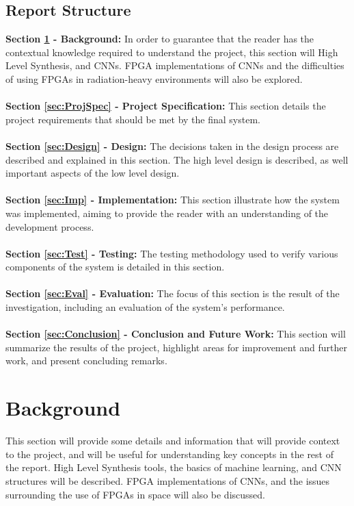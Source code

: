 \documentclass[12pt]{article}
\begin{document}
\subsection{Report Structure}
\label{sec:Intro-Structure}

\textbf{Section \ref{sec:Background} - Background:} In order to guarantee that the reader has the contextual knowledge required to understand the project, this section will High Level Synthesis, and CNNs. FPGA implementations of CNNs and the difficulties of using FPGAs in radiation-heavy environments will also be explored.\\
\\
\textbf{Section \ref{sec:ProjSpec} - Project Specification:} This section details the project requirements that should be met by the final system.\\
\\
\textbf{Section \ref{sec:Design} - Design:} The decisions taken in the design process are described and explained in this section. The high level design is described, as well important aspects of the low level design.\\
\\
\textbf{Section \ref{sec:Imp} - Implementation:} This section illustrate how the system was implemented, aiming to provide the reader with an understanding of the development process.\\
\\
\textbf{Section \ref{sec:Test} - Testing:} The testing methodology used to verify various components of the system is detailed in this section.\\
\\
\textbf{Section \ref{sec:Eval} - Evaluation:} The focus of this section is the result of the investigation, including an evaluation of the system's performance.\\
\\
\textbf{Section \ref{sec:Conclusion} - Conclusion and Future Work:} This section will summarize the results of the project, highlight areas for improvement and further work, and present concluding remarks.\\

\newpage

\section{Background}
\label{sec:Background}


This section will provide some details and information that will provide context to the project, and will be useful for understanding key concepts in the rest of the report. High Level Synthesis tools, the basics of machine learning, and CNN structures will be described. FPGA implementations of CNNs, and the issues surrounding the use of FPGAs in space will also be discussed.
\end{document}
